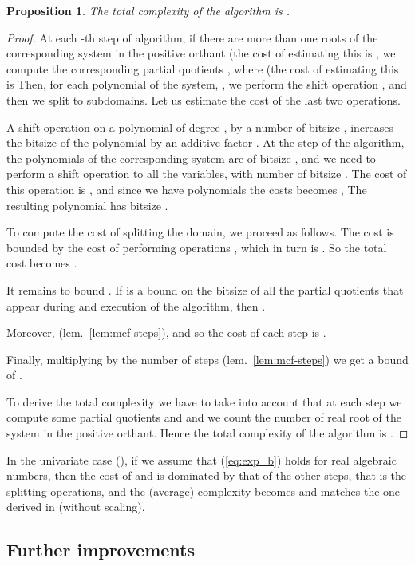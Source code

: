 \documentclass{sig-alternate}
\newtheorem{proposition}[theorem]{Proposition}
\begin{document}
\begin{proposition}
  \label{prop:mcf-complexity}
  The total complexity of the algorithm is 
  .  
\end{proposition}
\begin{proof}
  At each -th step of algorithm, 
  if there are more than one roots of the corresponding system in the positive orthant
  (the cost of estimating this is ,  
  we compute the corresponding partial quotients ,
  where 
  (the cost of estimating this is 
  Then, for each polynomial of the system, , we perform the shift operation
  ,
  and then we split to  subdomains.
  Let us estimate the cost of the last two operations.

  A shift operation on a polynomial of degree , by a
  number of bitsize , increases the bitsize of the polynomial by an
  additive factor .
At the  step of the algorithm, the polynomials of the corresponding system
  are of bitsize , and we need to
  perform a shift operation to all the variables, with number of bitsize
  .
  The cost of this operation is ,
  and since we have  polynomials the costs becomes 
  ,
  The resulting polynomial has bitsize .
  
  To compute the cost of splitting the domain, we proceed as follows.
  The cost is bounded by the cost of performing  operations ,
  which in turn is  
  .
  So the total cost becomes
  .

  
  It remains to bound .
  If  is a bound on the bitsize of all the partial quotients that appear
  during and execution of the algorithm, then 
  .

Moreover,  (lem.~\ref{lem:mcf-steps}),
  and so the cost of each step is
.
  
  Finally, multiplying by the number of steps (lem.~\ref{lem:mcf-steps})
  we get a bound of .  

  To derive the total complexity we have to take into account that at each step
  we compute some partial quotients and  and we count the number of real root of
  the system in the positive orthant.
  Hence the total complexity of the algorithm is 
  .  
\end{proof}

In the univariate case (),
if we assume that (\ref{eq:exp_b}) holds for real algebraic numbers, 
then the cost of  and 
is dominated by that of the other steps, that is the splitting operations, 
and the (average) complexity becomes 
and matches the one derived in \cite{et-tcs-2007}
(without scaling). 


\subsection{Further improvements}
\label{sec:complexity-improvements}
\end{document}
